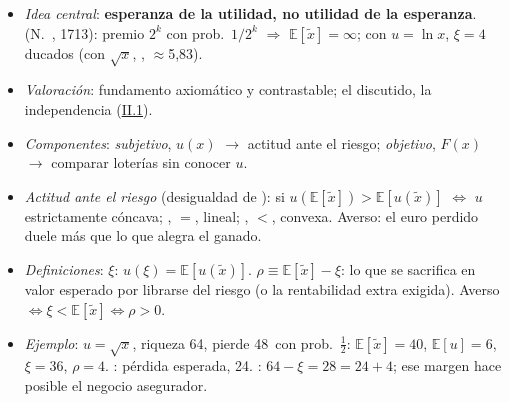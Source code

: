 \documentclass{article}
\begin{document}
\begin{columnas}
\begin{itemize}
\begin{itemize}
  \item $u$ única salvo \emph{afines positivas} $a\,u+b$ $\Rightarrow$  (sin comparaciones interpersonales);
  \item $u$ es un \emph{resultado}; continuo: $U=\int u(x)\,dF(x)$.
  \end{itemize}
\item \emph{Idea central}: \textbf{esperanza de la utilidad, no utilidad de la esperanza}.  (N.\ , 1713): premio $2^k$ con prob.\ $1/2^k$ $\Rightarrow$ $\mathbb{E}[\tilde{x}]=\infty$; con $u=\ln x$, $\xi=4$ ducados (con $\sqrt{x}$, , $\approx$5,83).
\item \emph{Valoración}: fundamento axiomático y contrastable; el discutido, la independencia (\hyperref[rep:II.1]{II.1}).
\end{itemize}
\begin{itemize}
\item \emph{Componentes}: \emph{subjetivo}, $u(x)$ $\to$ actitud ante el riesgo; \emph{objetivo}, $F(x)$ $\to$ comparar loterías sin conocer $u$.
\item \emph{Actitud ante el riesgo} (desigualdad de ):  si $u(\mathbb{E}[\tilde{x}])>\mathbb{E}[u(\tilde{x})]$ $\iff$ $u$ estrictamente cóncava; , $=$, lineal; , $<$, convexa. Averso: el euro perdido duele más que lo que alegra el ganado.
\end{itemize}
\begin{itemize}
\item \emph{Definiciones}:  $\xi$: $u(\xi)=\mathbb{E}[u(\tilde{x})]$.  $\rho\equiv\mathbb{E}[\tilde{x}]-\xi$: lo que se sacrifica en valor esperado por librarse del riesgo (o la rentabilidad extra exigida). Averso $\iff\xi<\mathbb{E}[\tilde{x}]\iff\rho>0$.
\item \emph{Ejemplo}: $u=\sqrt{x}$, riqueza 64, pierde 48~con prob.\ $\frac12$: $\mathbb{E}[\tilde{x}]=40$, $\mathbb{E}[u]=6$, $\xi=36$, $\rho=4$. : pérdida esperada, 24. : $64-\xi=28=24+4$; ese margen hace posible el negocio asegurador.
\end{itemize}

\end{columnas}
\end{document}

